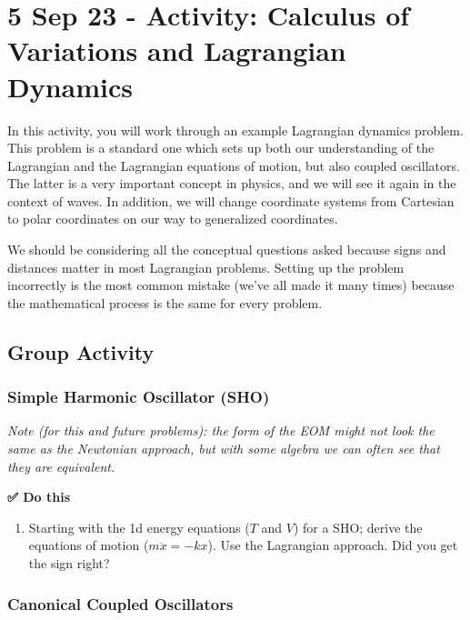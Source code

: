 \section{5 Sep 23 - Activity: Calculus of Variations and Lagrangian
Dynamics}\label{sep-23---activity-calculus-of-variations-and-lagrangian-dynamics}

In this activity, you will work through an example Lagrangian dynamics
problem. This problem is a standard one which sets up both our
understanding of the Lagrangian and the Lagrangian equations of motion,
but also coupled oscillators. The latter is a very important concept in
physics, and we will see it again in the context of waves. In addition,
we will change coordinate systems from Cartesian to polar coordinates on
our way to generalized coordinates.

We should be considering all the conceptual questions asked because
signs and distances matter in most Lagrangian problems. Setting up the
problem incorrectly is the most common mistake (we've all made it many
times) because the mathematical process is the same for every problem.

\subsection{Group Activity}\label{group-activity}

\subsubsection{Simple Harmonic Oscillator
(SHO)}\label{simple-harmonic-oscillator-sho}

\emph{Note (for this and future problems): the form of the EOM might not
look the same as the Newtonian approach, but with some algebra we can
often see that they are equivalent.}

\textbf{✅ Do this}

\begin{enumerate}
\def\labelenumi{\arabic{enumi}.}
\tightlist
\item
  Starting with the 1d energy equations (\(T\) and \(V\)) for a SHO;
  derive the equations of motion (\(m\ddot{x}=-kx\)). Use the Lagrangian
  approach. Did you get the sign right?
\end{enumerate}

\subsubsection{Canonical Coupled
Oscillators}\label{canonical-coupled-oscillators}

